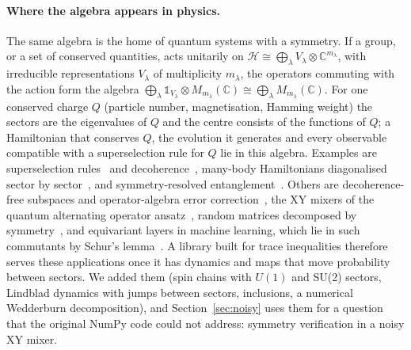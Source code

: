 \documentclass[11pt]{article}
\newcommand{\C}{\mathbb{C}}
\begin{document}
\paragraph{Where the algebra appears in physics.} The same algebra is the home of quantum systems with a symmetry. If a
group, or a set of conserved quantities, acts unitarily on $\mathcal H\cong\bigoplus_\lambda
V_\lambda\otimes\C^{m_\lambda}$, with irreducible representations $V_\lambda$ of multiplicity $m_\lambda$, the
operators commuting with the action form the algebra $\bigoplus_\lambda \mathbb 1_{V_\lambda}\otimes
M_{m_\lambda}(\C)\cong\bigoplus_\lambda M_{m_\lambda}(\C)$. For one conserved charge $Q$ (particle number,
magnetisation, Hamming weight) the sectors are the eigenvalues of $Q$ and the centre consists of the functions of $Q$;
a Hamiltonian that conserves $Q$, the evolution it generates and every observable compatible with a superselection
rule for $Q$ lie in this algebra. Examples are superselection rules~\cite{wick1952,bartlett2007} and
decoherence~\cite{zurek2003}, many-body Hamiltonians diagonalised sector by sector~\cite{sandvik2010,weinberg2017},
and symmetry-resolved entanglement~\cite{goldstein2018,xavier2018}. Others are decoherence-free subspaces and
operator-algebra error correction~\cite{zanardi1997,knill2000,beny2007}, the XY mixers of the quantum alternating operator
ansatz~\cite{hadfield2019,wang2020}, random matrices decomposed by symmetry~\cite{dyson1962,mehta2004}, and
equivariant layers in machine learning, which lie in such commutants by Schur's
lemma~\cite{cohen2016,finzi2021,fulton1991}. A library built for trace inequalities therefore serves these
applications once it has dynamics and maps that move probability between sectors. We added them (spin chains with
$U(1)$ and SU(2) sectors, Lindblad dynamics with jumps between sectors, inclusions, a numerical Wedderburn
decomposition), and Section~\ref{sec:noisy} uses them for a question that the original NumPy code could not address:
symmetry verification in a noisy XY mixer.
\end{document}
